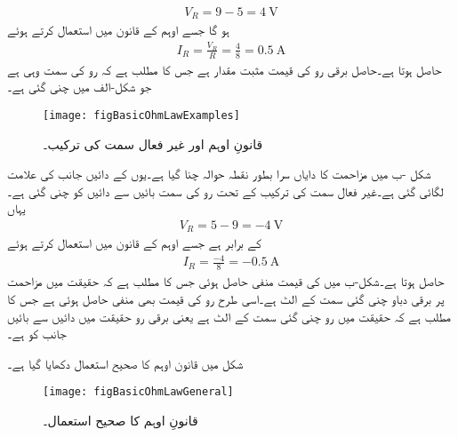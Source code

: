 \begin{align*}
V_R=9-5=\SI{4}{\volt}
\end{align*}  
ہو گا جسے اوہم کے قانون میں استعمال کرتے ہوئے
\begin{align*}
I_R=\frac{V_R}{R}=\frac{4}{8}=\SI{0.5}{\ampere}
\end{align*}
حاصل ہوتا ہے۔حاصل برقی رو کی قیمت مثبت مقدار ہے جس کا مطلب ہے  کہ رو کی سمت وہی ہے جو شکل-الف میں چنی گئی ہے۔


\begin{figure}
\centering
\texttt{[image: figBasicOhmLawExamples]}
\caption{قانونِ اوہم اور غیر فعال سمت کی ترکیب۔}
\label{شکل_بنیادی_قانون_اوہم_اور_غیر_عامل_ترکیب}
\end{figure}

شکل -ب میں مزاحمت کا دایاں سرا بطور نقطہ حوالہ چنا گیا ہے۔یوں  کے دائیں جانب  کی علامت لگائی گئی ہے۔غیر فعال سمت کی ترکیب کے تحت رو کی سمت بائیں سے دائیں کو چنی گئی ہے۔یہاں
\begin{align*}
V_R=5-9=\SI{-4}{\volt}
\end{align*}
کے برابر ہے جسے اوہم کے قانون میں استعمال کرتے ہوئے
\begin{align*}
I_R=\frac{-4}{8}=\SI{-0.5}{\ampere}
\end{align*}
حاصل ہوتا ہے۔شکل-ب میں  کی قیمت منفی حاصل ہوئی جس کا مطلب ہے کہ حقیقت میں مزاحمت پر برقی دباو چنی گئی سمت کے الٹ ہے۔اسی طرح رو  کی قیمت بھی منفی حاصل ہوئی ہے جس کا مطلب ہے کہ حقیقت میں رو چنی گئی سمت کے الٹ ہے یعنی برقی رو حقیقت میں دائیں سے بائیں جانب کو ہے۔

شکل  میں قانون اوہم کا صحیح استعمال دکھایا گیا ہے۔



\begin{figure}
\centering
\texttt{[image: figBasicOhmLawGeneral]}
\caption{قانونِ اوہم کا صحیح استعمال۔ }
\label{شکل_بنیادی_قانون_اوہم_صحیح_استعمال}
\end{figure}


